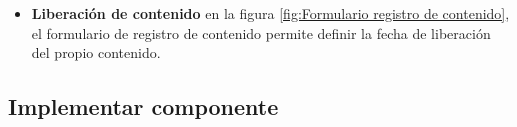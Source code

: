 \begin{itemize}
\item \textbf{Liberación de contenido} en la figura
\ref{fig:Formulario registro de contenido}, el formulario de registro de
contenido permite definir la fecha de liberación del propio contenido.

\begin{minipage}{1.0\linewidth}
	\centering
	\label{fig:Formulario registro de contenido}
\end{minipage}

\end{itemize}
	
\subsection{Implementar componente}

